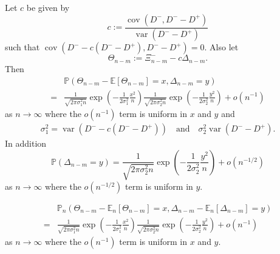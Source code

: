 \documentclass[draft]{scrartcl}
\newcommand{\E}{\mathbb E}
\newcommand{\littleo}{o}
\newcommand{\defeq}{:=}
\DeclareMathOperator{\var}{var}
\DeclareMathOperator{\cov}{cov}
\begin{document}
\begin{lemma}
    \label{lem:non-triangular-llt}
    Let $c$ be given by 
    \begin{equation}
        c \defeq \frac{\cov(D^-, D^- - D^+)}{\var(D^- - D^+)}
    \end{equation}
    such that $\cov(D^- - c(D^- - D^+), D^- - D^+) = 0$. Also let
    \begin{equation}
        \Theta_{n-m} \defeq \Xi^-_{n-m} - c\Delta_{n-m}.
    \end{equation}
    Then
    \begin{align}
        \label{eq:non-triangular-bi-llt}
        &\mathbb P\left( \Theta_{n-m} - \E[\Theta_{n-m}] = x, \Delta_{n-m} = y \right) \nonumber \\
        = &\frac{1}{\sqrt{2 \pi \sigma_1^2 n}} \exp\left(-\frac{1}{2 \sigma_1^2} \frac{x^2}{n}\right)
        \frac{1}{\sqrt{2 \pi \sigma_2^2 n}} \exp\left(-\frac{1}{2 \sigma_2^2} \frac{y^2}{n}\right) + \littleo\left( n^{-1} \right)
    \end{align}
    as $n \to \infty$ where the $\littleo(n^{-1})$ term is uniform in $x$ and $y$ and
    \begin{align}
        \sigma_1^2 = \var(D^- - c(D^- - D^+)) \quad \text{and} \quad \sigma_2^2 \var(D^- - D^+).
    \end{align}
    In addition
    \begin{equation}
        \label{eq:non-triangular-mono-llt}
        \mathbb P \left( \Delta_{n-m} = y \right)
        = \frac{1}{\sqrt{2 \pi \sigma_2^2 n}} \exp\left(-\frac{1}{2 \sigma_2^2} \frac{y^2}{n}\right) + \littleo\left( n^{-1/2} \right)
    \end{equation}
    as $n \to \infty$ where the $\littleo(n^{-1/2})$ term is uniform in $y$.
\end{lemma}

\begin{lemma}
    \label{lem:triangular-llt}
    \begin{align}
        \label{eq:triangular-llt}
        &\mathbb P_n\left( \Theta_{n-m} - \E_n[\Theta_{n-m}] = x, \Delta_{n-m} - \E_n[\Delta_{n-m}]= y \right) \nonumber \\
        = &\frac{1}{\sqrt{2 \pi \sigma_1^2 n}} \exp\left(-\frac{1}{2 \sigma_1^2} \frac{x^2}{n}\right)
        \frac{1}{\sqrt{2 \pi \sigma_2^2 n}} \exp\left(-\frac{1}{2 \sigma_2^2} \frac{y^2}{n}\right) + \littleo\left( n^{-1} \right)
    \end{align}
    as $n \to \infty$ where the $\littleo(n^{-1})$ term is uniform in $x$ and $y$.
\end{lemma}
\end{document}
